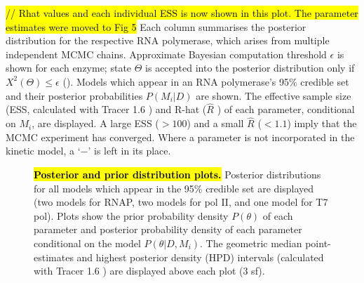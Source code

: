 \documentclass[10pt,letterpaper]{article}
\begin{document}
\begin{table}[!ht]
\begin{adjustwidth}{-2.25in}{0in}
{\begin{tabular}{|cc|cc|cc|c|}
\end{tabular}
}
\begin{flushleft} \hl{// Rhat values and each individual ESS is now shown in this plot. The parameter estimates were moved to Fig 5}  Each column summarises the posterior distribution for the respective RNA polymerase, which arises from multiple independent MCMC chains. Approximate Bayesian computation threshold $\epsilon$ is shown for each enzyme; state $\Theta$ is accepted into the posterior distribution only if $X^2(\Theta) \leq \epsilon$ (). Models which appear in an RNA polymerase's 95\% credible set and their posterior probabilities $P(M_i|D)$ are shown. The effective sample size (ESS, calculated with Tracer 1.6 \cite{rambaut2013tracer}) and R-hat ($\hat{R}$ \cite{gelman1992inference, brooks1998general, brooks2011handbook}) of each parameter, conditional on $M_i$, are displayed. A large ESS ($> 100$) and a small $\hat{R}$ ($< 1.1$) imply that the MCMC experiment has converged. Where a parameter is not incorporated in the kinetic model, a `$-$' is left in its place.
\end{flushleft}
\label{table1}
\end{adjustwidth}
\end{table}





\begin{figure}[!ht]
\caption{\hl{\textbf{Posterior and prior distribution plots.}} Posterior distributions for all models which appear in the 95\% credible set are displayed (two models for RNAP, two models for pol II, and one model for T7 pol). Plots show the prior probability density $P(\theta)$ of each parameter and posterior probability density of each parameter conditional on the model $P(\theta | D, M_i)$. The geometric median point-estimates and  highest posterior density (HPD) intervals (calculated with Tracer 1.6 \cite{rambaut2013tracer}) are displayed above each plot (3 sf). }
\label{fig5}
\end{figure}
\end{document}
